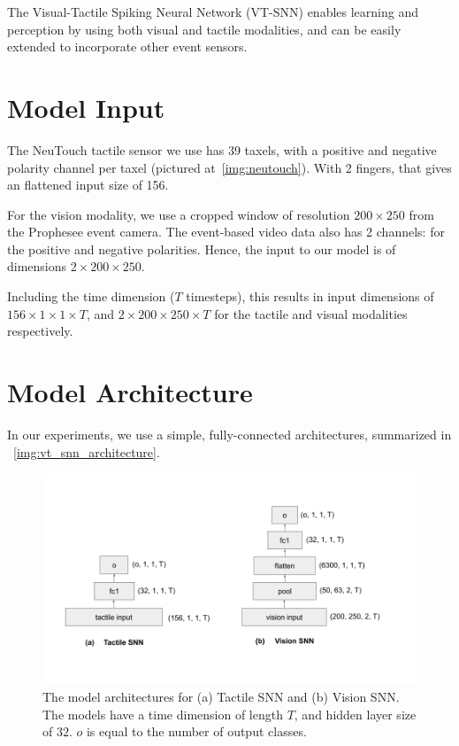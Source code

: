 \documentclass[fyp]{socreport}
\begin{document}
The Visual-Tactile Spiking Neural Network (VT-SNN) enables learning and
perception by using both visual and tactile modalities, and can be easily
extended to incorporate other event sensors.

\section{Model Input}

The NeuTouch tactile sensor we use has 39 taxels, with a positive and negative
polarity channel per taxel (pictured at~\autoref{img:neutouch}). With 2 fingers,
that gives an flattened input size of 156.

For the vision modality, we use a cropped window of resolution $200 \times 250$
from the Prophesee event camera. The event-based video data also has 2 channels:
for the positive and negative polarities. Hence, the input to our model is of
dimensions $2 \times 200 \times 250$.

Including the time dimension ($T$ timesteps), this results in input dimensions
of $156 \times 1 \times 1 \times T$, and $2 \times 200 \times 250 \times T$ for
the tactile and visual modalities respectively.

\section{Model Architecture}

In our experiments, we use a simple, fully-connected architectures, summarized in
~\autoref{img:vt_snn_architecture}.

\begin{figure}
  \centering
  \includegraphics[width=0.75\columnwidth]{images/tact_vis_arch.png}
  \caption{The model architectures for (a) Tactile SNN and (b) Vision SNN. The
    models have a time dimension of length $T$, and hidden layer size of $32$.
    $o$ is equal to the number of output
    classes.\label{img:vt_snn_architecture}}
\end{figure}
\end{document}
